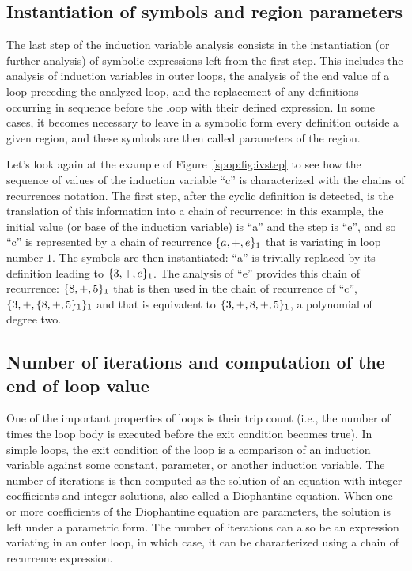 \subsection{Instantiation of symbols and region parameters}

The last step of the induction variable analysis consists in the
instantiation (or further analysis) of symbolic expressions left from
the first step.  This includes the analysis of induction variables in
outer loops, the analysis of the end value of a loop preceding the
analyzed loop, and the replacement of any definitions occurring in
sequence before the loop with their defined expression.  In some
cases, it becomes necessary to leave in a symbolic form every
definition outside a given region, and these symbols are then called
parameters of the region.

Let's look again at the example of Figure~\ref{spop:fig:ivstep} to
see how the sequence of values of the induction variable ``c'' is
characterized with the chains of recurrences notation.  The first
step, after the cyclic definition is detected, is the translation of
this information into a chain of recurrence: in this example, the
initial value (or base of the induction variable) is ``a'' and the
step is ``e'', and so ``c'' is represented by a chain of recurrence
$\{a, +, e\}_1$ that is variating in loop number $1$.  The symbols
are then instantiated: ``a'' is trivially replaced by its definition
leading to $\{3, +, e\}_1$.  The analysis of ``e'' provides this
chain of recurrence: $\{8, +, 5\}_1$ that is then used in the
chain of recurrence of ``c'', $\{3, +, \{8, +, 5\}_1\}_1$ and
that is equivalent to $\{3, +, 8, +, 5\}_1$, a polynomial of
degree two.

\subsection{Number of iterations and computation of the end of loop value}

One of the important properties of loops is their trip count (i.e.,
the number of times the loop body is executed before the exit
condition becomes true).  In simple loops, the exit condition of the
loop is a comparison of an induction variable against some constant,
parameter, or another induction variable.  The number of iterations is
then computed as the solution of an equation with integer coefficients
and integer solutions, also called a Diophantine equation.  When one
or more coefficients of the Diophantine equation are parameters, the
solution is left under a parametric form.  The number of iterations
can also be an expression variating in an outer loop, in which case,
it can be characterized using a chain of recurrence expression.

